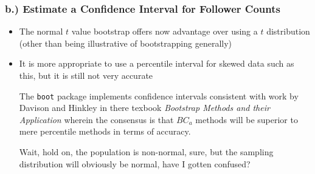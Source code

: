 \documentclass[11pt]{article}
\begin{document}
\subsubsection{b.) Estimate a Confidence Interval for Follower Counts}
\label{sec:org7374ef1}
\begin{itemize}
\item The normal \(t\) value bootstrap offers now advantage over using a \(t\) distribution (other than being illustrative of bootstrapping generally) \cite[Section 4.1]{hesterberg2015}
\item It is more appropriate to use a percentile interval for skewed data such as this, but it is still not very accurate \cite[Section 4.1]{hesterberg2015}

The \texttt{boot} package implements confidence intervals consistent with work by Davison and Hinkley \cite{ripley2020} in there texbook \emph{Bootstrap Methods and their Application} wherein the consensus is that \(BC_{a}\) methods will be  \cite[Ch. 5]{davison1997} superior to mere percentile methods in terms of accuracy. \cite[Ch. 5]{carpenter2000,davison1997}

Wait, hold on, the population is non-normal, sure, but the sampling distribution will obviously be normal, have I gotten confused?
\end{itemize}

\label{org3f0983d}


\label{orgb8f0c16}
 
\end{document}
